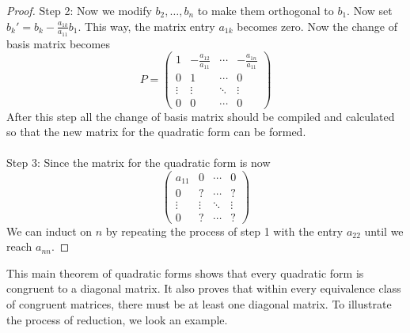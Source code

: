 \documentclass[a4paper]{article}
\begin{document}
\begin{thm}{}{}
\begin{proof}
Step 2: Now we modify $b_2,\dots,b_n$ to make them orthogonal to $b_1$. Now set $b_k'=b_k-\frac{a_{1k}}{a_{11}}b_1$. This way, the matrix entry $a_{1k}$ becomes zero. Now the change of basis matrix becomes $$P=\begin{pmatrix}
1 & -\frac{a_{12}}{a_{11}} & \cdots & -\frac{a_{1n}}{a_{11}}\\
0 & 1 & \cdots & 0\\
\vdots & \vdots & \ddots & \vdots\\
0 & 0 & \cdots & 0
\end{pmatrix}$$
After this step all the change of basis matrix should be compiled and calculated so that the new matrix for the quadratic form can be formed. \\~\\
Step 3: Since the matrix for the quadratic form is now $$\begin{pmatrix}
a_{11} & 0 & \cdots & 0\\
0 & ? & \cdots & ?\\
\vdots & \vdots & \ddots & \vdots\\
0 & ? & \cdots & ?
\end{pmatrix}$$
We can induct on $n$ by repeating the process of step 1 with the entry $a_{22}$ until we reach $a_{nn}$. 
\end{proof}
\end{thm}


This main theorem of quadratic forms shows that every quadratic form is congruent to a diagonal matrix. It also proves that within every equivalence class of congruent matrices, there must be at least one diagonal matrix. To illustrate the process of reduction, we look an example. 
\end{document}
